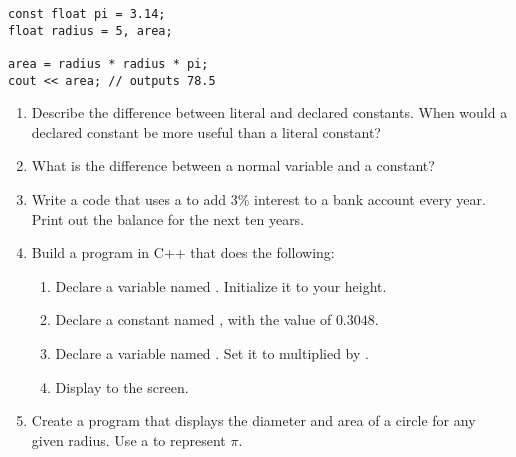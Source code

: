 \noindent\begin{minipage}{\linewidth}\begin{lstlisting}
const float pi = 3.14;
float radius = 5, area;

area = radius * radius * pi;
cout << area; // outputs 78.5
\end{lstlisting}\end{minipage}


\begin{enumerate}
	\item Describe the difference between literal and declared constants. When would a declared constant be more useful than a literal constant?
	\item What is the difference between a normal variable and a constant?
	\item Write a code that uses a  to add 3\% interest to a bank account every year. Print out the balance for the next ten years.
	\item Build a program in C++ that does the following:
	
	\begin{enumerate}
		\item Declare a  variable named . Initialize it to your height.
		\item Declare a  constant named , with the value of $0.3048$.
		\item Declare a  variable named . Set it to  multiplied by .
		\item	Display  to the screen.
	\end{enumerate}

	\item Create a program that displays the diameter and area of a circle for any given radius. Use a  to represent $\pi$. 

\end{enumerate}



